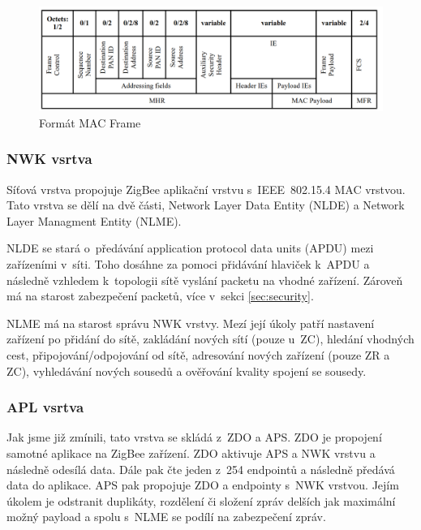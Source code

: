 \documentclass[a4paper,10pt,titlepage]{article}
\begin{document}
\begin{figure}[h]
	\centering
	\includegraphics[width=\textwidth]{assets/mac_frame.png}
	\caption[Formát MAC Frame]{Formát MAC Frame~\cite{5173521}}
	\label{fig:mac_frame}
\end{figure}

\subsubsection{NWK vsrtva} \label{sec:NWK}
Síťová vrstva propojuje ZigBee aplikační vrstvu s~IEEE~802.15.4 MAC vrstvou. Tato vrstva se dělí na dvě části, Network Layer Data Entity (NLDE) a Network Layer Managment Entity (NLME).

NLDE se stará o~předávání application protocol data units (APDU) mezi zařízeními v~síti. Toho dosáhne za pomoci přidávání hlaviček k~APDU a následně vzhledem k~topologii sítě vyslání packetu na vhodné zařízení. Zároveň má na starost zabezpečení packetů, více v~sekci \ref{sec:security}.

NLME má na starost správu NWK vrstvy. Mezí její úkoly patří nastavení zařízení po přidání do sítě, zakládání nových sítí (pouze u~ZC), hledání vhodných cest, připojování/odpojování od sítě, adresování nových zařízení (pouze ZR a ZC), vyhledávání nových sousedů a ověřování kvality spojení se sousedy.

\subsubsection{APL vsrtva} \label{sec:APL}
Jak jsme již zmínili, tato vrstva se skládá z~ZDO a APS. ZDO je propojení samotné aplikace na ZigBee zařízení. ZDO aktivuje APS a NWK vrstvu a následně odesílá data. Dále pak čte jeden z~254 endpointů a následně předává data do aplikace. APS pak propojuje ZDO a endpointy s~NWK vrstvou. Jejím úkolem je odstranit duplikáty, rozdělení či složení zpráv delších jak maximální možný payload a spolu s~NLME se podílí na zabezpečení zpráv.
\end{document}
